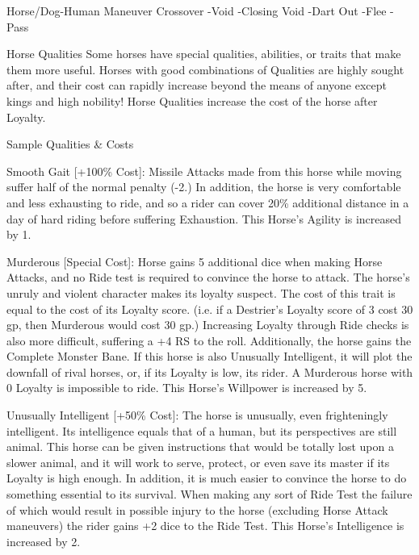 \documentclass[oneside,11pt,english]{book}
\begin{document}
 

Horse/Dog-Human Maneuver Crossover 
-Void 
-Closing Void 
-Dart Out 
-Flee 
-Pass 

 

Horse Qualities 
Some horses have special qualities, abilities, or traits that make them more useful. Horses with good 
combinations of Qualities are highly sought after, and their cost can rapidly increase beyond the means of 
anyone except kings and high nobility! 
Horse Qualities increase the cost of the horse after Loyalty. 

 

Sample Qualities \& Costs 

 

Smooth Gait [+100\% Cost]: Missile Attacks made from this horse while moving suffer half of the normal 
penalty (-2.) In addition, the horse is very comfortable and less exhausting to ride, and so a rider can 
cover 20\% additional distance in a day of hard riding before suffering Exhaustion. 
This Horse’s Agility is increased by 1. 

 

Murderous [Special Cost]: Horse gains 5 additional dice when making Horse Attacks, and no Ride test is 
required to convince the horse to attack. The horse’s unruly and violent character makes its loyalty 
suspect. The cost of this trait is equal to the cost of its Loyalty score. (i.e. if a Destrier’s Loyalty score of 3 
cost 30 gp, then Murderous would cost 30 gp.) Increasing Loyalty through Ride checks is also more 
difficult, suffering a +4 RS to the roll. 
Additionally, the horse gains the Complete Monster Bane. If this horse is also Unusually Intelligent, it 
will plot the downfall of rival horses, or, if its Loyalty is low, its rider. A Murderous horse with 0 Loyalty 
is impossible to ride. 
This Horse’s Willpower is increased by 5. 

 

Unusually Intelligent [+50\% Cost]: The horse is unusually, even frighteningly intelligent. Its intelligence 
equals that of a human, but its perspectives are still animal. This horse can be given instructions that 
would be totally lost upon a slower animal, and it will work to serve, protect, or even save its master if its 
Loyalty is high enough. In addition, it is much easier to convince the horse to do something essential to its 
survival. When making any sort of Ride Test the failure of which would result in possible injury to the 
horse (excluding Horse Attack maneuvers) the rider gains +2 dice to the Ride Test. 
This Horse’s Intelligence is increased by 2. 
\end{document}
